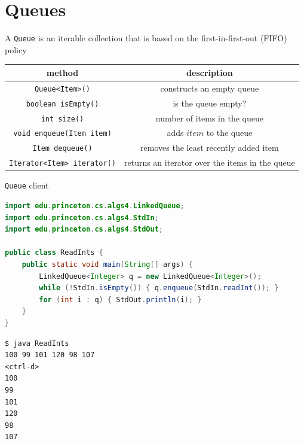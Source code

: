 \documentclass[8pt,a4paper,compress]{beamer}
\begin{document}
\section{Queues}
\begin{frame}[fragile]
A \lstinline{Queue} is an iterable collection that is based on the first-in-first-out (FIFO) policy
\begin{center}
\begin{tabular}{cc}
method & description \\ \hline
\lstinline$Queue<Item>()$ & constructs an empty queue \\
\lstinline$boolean isEmpty()$ & is the queue empty? \\
\lstinline$int size()$ & number of items in the queue \\
\lstinline$void enqueue(Item item)$ & adds $item$ to the queue \\
\lstinline$Item dequeue()$ & removes the least recently added item \\
\lstinline$Iterator<Item> iterator()$ & returns an iterator over the items in the queue
\end{tabular} 
\end{center}

\lstinline{Queue} client
\begin{lstlisting}[language=Java]
import edu.princeton.cs.algs4.LinkedQueue;
import edu.princeton.cs.algs4.StdIn;
import edu.princeton.cs.algs4.StdOut;

public class ReadInts {
    public static void main(String[] args) {
        LinkedQueue<Integer> q = new LinkedQueue<Integer>();
        while (!StdIn.isEmpty()) { q.enqueue(StdIn.readInt()); }
        for (int i : q) { StdOut.println(i); }
    }
}
\end{lstlisting}

\begin{lstlisting}[language={}]
$ java ReadInts
100 99 101 120 98 107
<ctrl-d>
100
99
101
120
98
107
\end{lstlisting}
\end{frame}
\end{document}

